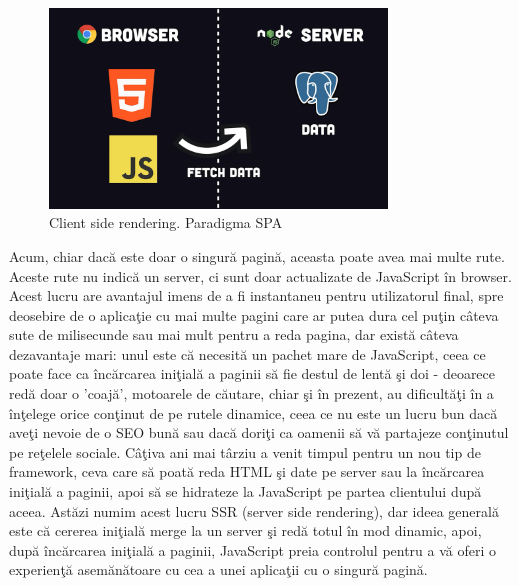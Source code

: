 \documentclass[12pt, a4paper]{report}
\begin{document}
\begin{figure}[htbp]
	\centering
	\includegraphics[width=0.8\textwidth]{38.png}
	\caption{Client side rendering. Paradigma SPA}
	\label{fig:spa}
\end{figure}

Acum, chiar dac\u a este doar o singur\u a pagin\u a, aceasta poate avea mai multe rute. Aceste rute nu indic\u a un server, ci sunt doar actualizate de JavaScript \^ in browser. Acest lucru are avantajul imens de a fi instantaneu pentru utilizatorul final, spre deosebire de o aplica\c tie cu mai multe pagini care ar putea dura cel pu\c tin c\^ ateva sute de milisecunde sau mai mult pentru a reda pagina, dar exist\u a c\^ ateva dezavantaje mari: unul este c\u a necesit\u a un pachet mare de JavaScript, ceea ce poate face ca \^ inc\u arcarea ini\c tial\u a a paginii s\u a fie destul de lent\u a \c si doi - deoarece red\u a doar o 'coaj\u a', motoarele de c\u autare, chiar \c si \^ in prezent, au dificult\u a\c ti \^ in a \^ in\c telege orice con\c tinut de pe rutele dinamice, ceea ce nu este un lucru bun dac\u a ave\c ti nevoie de o SEO bun\u a sau dac\u a dori\c ti ca oamenii s\u a v\u a partajeze con\c tinutul pe re\c telele sociale. C\^ a\c tiva ani mai t\^ arziu a venit timpul pentru un nou tip de framework, ceva care s\u a poat\u a reda HTML \c si date pe server sau la \^ inc\u arcarea ini\c tial\u a a paginii, apoi s\u a se hidrateze la JavaScript pe partea clientului dup\u a aceea. Ast\u azi numim acest lucru SSR (server side rendering), dar ideea general\u a este c\u a cererea ini\c tial\u a merge la un server \c si red\u a totul \^ in mod dinamic, apoi, dup\u a \^ inc\u arcarea ini\c tial\u a a paginii, JavaScript preia controlul pentru a v\u a oferi o experien\c t\u a asem\u an\u atoare cu cea a unei aplica\c tii cu o singur\u a pagin\u a.
\end{document}
